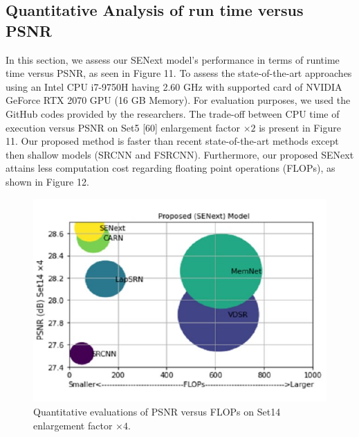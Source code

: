 \documentclass{ieeeaccess}
\begin{document}
\subsection{Quantitative Analysis of run time versus PSNR}
In this section, we assess our SENext model's performance in terms of runtime time versus PSNR, as seen in Figure 11. To assess the state-of-the-art approaches using an Intel CPU i7-9750H having 2.60 GHz with supported card of NVIDIA GeForce RTX 2070 GPU (16 GB Memory). For evaluation purposes, we used the GitHub codes provided by the researchers. The trade-off between CPU time of execution versus PSNR on Set5 [60] enlargement factor $\times 2$ is present in Figure 11. Our proposed method is faster than recent state-of-the-art methods except then shallow models (SRCNN and FSRCNN). Furthermore, our proposed SENext attains less computation cost regarding floating point operations (FLOPs), as shown in Figure 12.

\begin{figure}[ht]
  \includegraphics[width=\linewidth]{12FIGURE.pdf}
  \caption{Quantitative evaluations of PSNR versus FLOPs on Set14 enlargement factor $\times4$.}
  \label{fig:12}
\end{figure}
\end{document}

